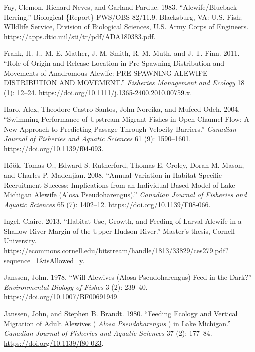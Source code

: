 \documentclass[
]{book}
\newlength{\cslhangindent}
\newlength{\cslentryspacingunit} %
\newenvironment{CSLReferences}[2] %
 {%
  \setlength{\parindent}{0pt}
  \ifodd #1
  \let\oldpar\par
  \def\par{\hangindent=\cslhangindent\oldpar}
  \fi
  \setlength{\parskip}{#2\cslentryspacingunit}
 }%
 {}
\begin{document}
\begin{CSLReferences}{1}{0}
\leavevmode{}%
Fay, Clemon, Richard Neves, and Garland Pardue. 1983. {``Alewife/{Blueback} {Herring}.''} Biological \{Report\} FWS/OBS-82/11.9. Blacksburg, VA: U.S. Fish; WIldlife Service, Division of Biological Sciences, U.S. Army Corps of Engineers. \url{https://apps.dtic.mil/sti/tr/pdf/ADA180383.pdf}.

\leavevmode{}%
Frank, H. J., M. E. Mather, J. M. Smith, R. M. Muth, and J. T. Finn. 2011. {``Role of Origin and Release Location in Pre-Spawning Distribution and Movements of Anadromous Alewife: {PRE}-{SPAWNING} {ALEWIFE} {DISTRIBUTION} {AND} {MOVEMENT}.''} \emph{Fisheries Management and Ecology} 18 (1): 12--24. \url{https://doi.org/10.1111/j.1365-2400.2010.00759.x}.

\leavevmode{}%
Haro, Alex, Theodore Castro-Santos, John Noreika, and Mufeed Odeh. 2004. {``Swimming Performance of Upstream Migrant Fishes in Open-Channel Flow: A New Approach to Predicting Passage Through Velocity Barriers.''} \emph{Canadian Journal of Fisheries and Aquatic Sciences} 61 (9): 1590--1601. \url{https://doi.org/10.1139/f04-093}.

\leavevmode{}%
Höök, Tomas O., Edward S. Rutherford, Thomas E. Croley, Doran M. Mason, and Charles P. Madenjian. 2008. {``Annual Variation in Habitat-Specific Recruitment Success: Implications from an Individual-Based Model of {Lake} {Michigan} Alewife ({Alosa} Pseudoharengus).''} \emph{Canadian Journal of Fisheries and Aquatic Sciences} 65 (7): 1402--12. \url{https://doi.org/10.1139/F08-066}.

\leavevmode{}%
Ingel, Claire. 2013. {``Habitat {Use}, {Growth}, and {Feeding} of {Larval} {Alewife} in a {Shallow} {River} {Margin} of the {Upper} {Hudson} {River}.''} Master's thesis, Cornell University. \url{https://ecommons.cornell.edu/bitstream/handle/1813/33829/ces279.pdf?sequence=1\&isAllowed=y}.

\leavevmode{}%
Janssen, John. 1978. {``Will Alewives ({Alosa} Pseudoharengus) Feed in the Dark?''} \emph{Environmental Biology of Fishes} 3 (2): 239--40. \url{https://doi.org/10.1007/BF00691949}.

\leavevmode{}%
Janssen, John, and Stephen B. Brandt. 1980. {``Feeding {Ecology} and {Vertical} {Migration} of {Adult} {Alewives} ( \emph{{Alosa} Pseudoharengus} ) in {Lake} {Michigan}.''} \emph{Canadian Journal of Fisheries and Aquatic Sciences} 37 (2): 177--84. \url{https://doi.org/10.1139/f80-023}.


\end{CSLReferences}
\end{document}
